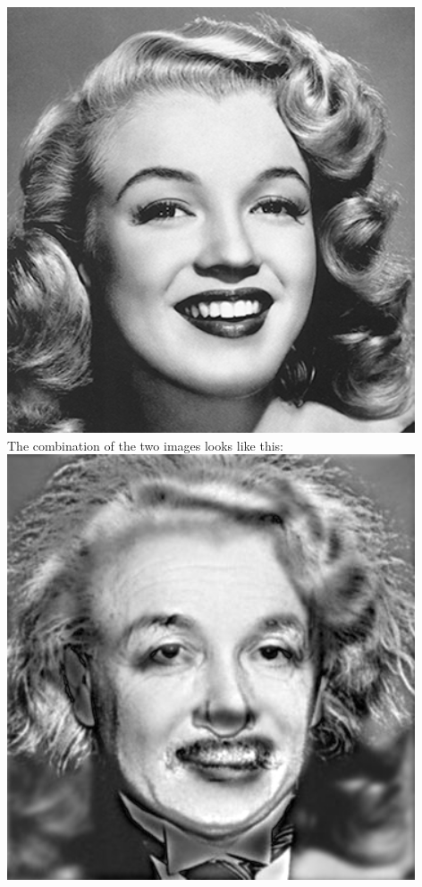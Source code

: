 \documentclass[notitlepage]{article}
\begin{document}
\includegraphics[width=4.75in]{../assets/images/monroe.png}
\\
The combination of the two images looks like this:
\\
\includegraphics[width=4.75in]{../samples/images/einstein_monroe.png}
\\
\end{document}
